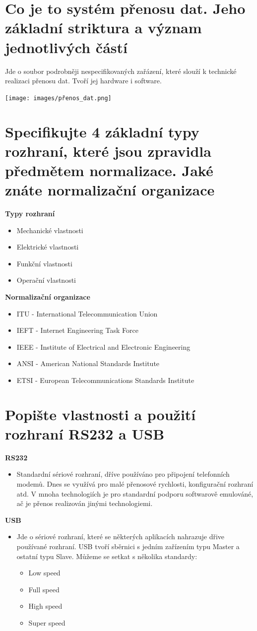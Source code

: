 \section{Co je to systém přenosu dat. Jeho základní striktura a význam jednotlivých částí}
Jde o soubor podrobněji nespecifikovaných zařázení, které slouží k technické realizaci přenosu dat.
Tvoří jej hardware i software.

\texttt{[image: images/přenos\_dat.png]}

\section{Specifikujte  4 základní typy rozhraní, které jsou zpravidla předmětem normalizace. Jaké znáte normalizační organizace}
\textbf{Typy rozhraní}
\begin{itemize}
    \item Mechanické vlastnosti
    \item Elektrické vlastnosti
    \item Funkční vlastnosti
    \item Operační vlastnosti
\end{itemize}
\textbf{Normalizační organizace}
\begin{itemize}
    \item ITU - International Telecommunication Union
     \item IEFT - Internet Engineering Task Force
     \item IEEE - Institute of Electrical and Electronic Engineering
     \item ANSI - American National Standards Institute
     \item ETSI - European Telecommunications Standards Institute
\end{itemize}

\section{Popište vlastnosti a použití rozhraní RS232 a USB}
\textbf{RS232}
\begin{itemize}
    \item Standardní sériové rozhraní, dříve používáno pro připojení telefonních modemů.
    Dnes se využívá pro malé přenosové rychlosti, konfigurační rozhraní atd.
    V mnoha technologiích je pro standardní podporu softwarově emulováné, ač je přenos realizován jinými technologiemi.
\end{itemize}
\textbf{USB}
\begin{itemize}
    \item Jde o sériové rozhraní, které se některých aplikacích nahrazuje dřive používané rozhraní.
    USB tvoří sběrnici s jedním zařízením typu Master a ostatní typu Slave.
    Můžeme se setkat s několika standardy:
\begin{itemize}
    \item Low speed
    \item Full speed
    \item High speed
    \item Super speed
\end{itemize}
\end{itemize}
